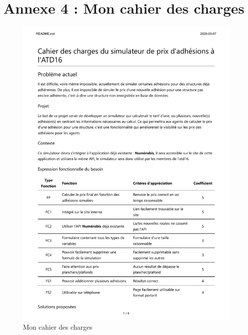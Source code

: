 \documentclass[a4paper,12pt]{report}
\begin{document}
\section{Annexe 4 : Mon cahier des charges}
\begin{figure}[H]
    \centering
    \includegraphics[scale=0.6]{cahier_des_charges.pdf}
    \caption{Mon cahier des charges}
    \label{fig:cahier-charges}
\end{figure}
\end{document}
